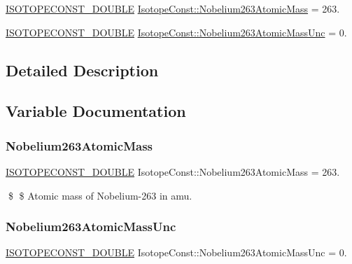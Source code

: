 \begin{DoxyCompactItemize}
\item 
\mbox{\hyperlink{group___isotope_const-_macros_ga8f45a7272ce02c0b4c65c44636ed719a}{I\+S\+O\+T\+O\+P\+E\+C\+O\+N\+S\+T\+\_\+\+D\+O\+U\+B\+LE}} \mbox{\hyperlink{group___isotope_const-_nobelium-_no263_ga730b012b9b405746c6c56cf0e238b88f}{Isotope\+Const\+::\+Nobelium263\+Atomic\+Mass}} = 263.
\item 
\mbox{\hyperlink{group___isotope_const-_macros_ga8f45a7272ce02c0b4c65c44636ed719a}{I\+S\+O\+T\+O\+P\+E\+C\+O\+N\+S\+T\+\_\+\+D\+O\+U\+B\+LE}} \mbox{\hyperlink{group___isotope_const-_nobelium-_no263_gac6b49af491a6bddc61cb0acdf8edf3fb}{Isotope\+Const\+::\+Nobelium263\+Atomic\+Mass\+Unc}} = 0.
\end{DoxyCompactItemize}


\subsection{Detailed Description}


\subsection{Variable Documentation}
\mbox{\label{group___isotope_const-_nobelium-_no263_ga730b012b9b405746c6c56cf0e238b88f}} 
\subsubsection{\texorpdfstring{Nobelium263\+Atomic\+Mass}{Nobelium263AtomicMass}}
{\footnotesize\ttfamily \mbox{\hyperlink{group___isotope_const-_macros_ga8f45a7272ce02c0b4c65c44636ed719a}{I\+S\+O\+T\+O\+P\+E\+C\+O\+N\+S\+T\+\_\+\+D\+O\+U\+B\+LE}} Isotope\+Const\+::\+Nobelium263\+Atomic\+Mass = 263.}

\$ \$ Atomic mass of Nobelium-\/263 in amu. \mbox{\label{group___isotope_const-_nobelium-_no263_gac6b49af491a6bddc61cb0acdf8edf3fb}} 
\subsubsection{\texorpdfstring{Nobelium263\+Atomic\+Mass\+Unc}{Nobelium263AtomicMassUnc}}
{\footnotesize\ttfamily \mbox{\hyperlink{group___isotope_const-_macros_ga8f45a7272ce02c0b4c65c44636ed719a}{I\+S\+O\+T\+O\+P\+E\+C\+O\+N\+S\+T\+\_\+\+D\+O\+U\+B\+LE}} Isotope\+Const\+::\+Nobelium263\+Atomic\+Mass\+Unc = 0.}

